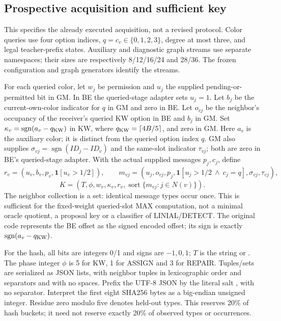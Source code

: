 \subsection{Prospective acquisition and sufficient key}\label{app:prospective-method}
This specifies the already executed acquisition, not a revised protocol.
Color queries use four option indices, $q=c_v\in\{0,1,2,3\}$, degree at
most three, and legal teacher-prefix states. Auxiliary and diagnostic graph
streams use separate namespaces; their sizes are respectively 8/12/16/24
and 28/36. The frozen configuration and graph generators identify the streams.

For each queried color, let $w_j$ be permission and $u_j$ the supplied
pending-or-permitted bit in GM. In BE the queried-stage adapter sets $u_j=1$.
Let $b_j$ be the current-own-color indicator for $q$ in GM and zero in BE.
Let $o_{vj}$ be the neighbor's occupancy of the receiver's queried KW option
in BE and $b_j$ in GM. Set $\kappa_v=\operatorname{sgn}(a_v-q_{\rm KW})$
in KW, where $q_{\rm KW}=\lceil4B/5\rceil$, and zero in GM. Here $a_v$
is the auxiliary color; it is distinct from the queried option index $q$.
GM also supplies $\sigma_{vj}=\operatorname{sgn}(ID_j-ID_v)$ and the
same-slot indicator $\tau_{vj}$; both are zero in BE's queried-stage adapter.
With the actual supplied messages $p_j,c_j$, define
\[
 r_v=(u_v,b_v,p_v,\mathbf1[u_v>1/2]),\qquad
 m_{vj}=(u_j,o_{vj},p_j,\mathbf1[u_j>1/2\ \land\ c_j=q],
             \sigma_{vj},\tau_{vj}),
\]
\[
 K=(T,\phi,w_v,\kappa_v,r_v,
       \operatorname{sort}\{m_{vj}:j\in N(v)\}).
\]
The neighbor collection is a set: identical message types occur once.
This is sufficient for the fixed-weight queried-slot MAX computation, not a
minimal oracle quotient, a proposal key or a classifier of LINIAL/DETECT.
The original code represents the BE offset as the signed encoded offset;
its sign is exactly $\operatorname{sgn}(a_v-q_{\rm KW})$.

For the hash, all bits are integers 0/1 and signs are $-1,0,1$; $T$ is the
string  or . The phase integer $\phi$
is 5 for KW, 1 for ASSIGN and 3 for REPAIR. Tuples/sets are serialized as
JSON lists, with neighbor tuples in lexicographic order and separators
\code{,} and \code{:} with no spaces. Prefix the UTF-8 JSON by the literal
salt , with no separator. Interpret
the first eight SHA256 bytes as a big-endian unsigned integer. Residue zero
modulo five denotes held-out types. This reserves 20\% of hash buckets;
it need not reserve exactly 20\% of observed types or occurrences.

